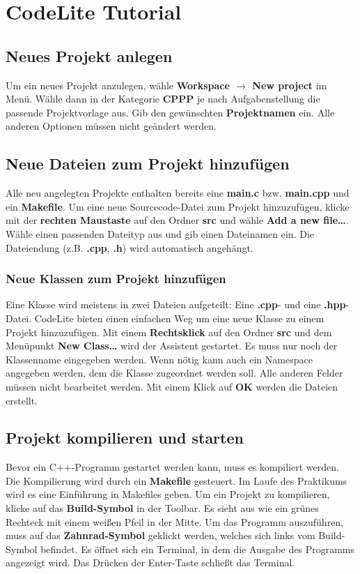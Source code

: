 \section{\ExercisePrefixAdditionalInformation CodeLite Tutorial}

\subsection{Neues Projekt anlegen}
Um ein neues Projekt anzulegen, wähle \textbf{Workspace $\rightarrow$ New project} im Menü. 
Wähle dann in der Kategorie \textbf{CPPP} je nach Aufgabenstellung die passende Projektvorlage aus.
Gib den gewünschten \textbf{Projektnamen} ein. 
Alle anderen Optionen müssen nicht geändert werden.

\subsection{Neue Dateien zum Projekt hinzufügen}
Alle neu angelegten Projekte enthalten bereits eine \textbf{main.c} bzw. \textbf{main.cpp} und ein \textbf{Makefile}.
Um eine neue Sourcecode-Datei zum Projekt hinzuzufügen, klicke mit der \textbf{rechten Maustaste} auf den Ordner \textbf{src} und wähle \textbf{Add a new file\dots}.
Wähle einen passenden Dateityp aus und gib einen Dateinamen ein.
Die Dateiendung (z.B. \textbf{.cpp}, \textbf{.h}) wird automatisch angehängt.

\subsubsection{Neue Klassen zum Projekt hinzufügen}
Eine Klasse wird meistens in zwei Dateien aufgeteilt: Eine \textbf{.cpp}- und eine \textbf{.hpp}-Datei. 
CodeLite bieten einen einfachen Weg um eine neue Klasse zu einem Projekt hinzuzufügen. 
Mit einem \textbf{Rechtsklick} auf den Ordner \textbf{src} und dem Menüpunkt \textbf{New Class\dots} wird der Assistent gestartet. 
Es muss nur noch der Klassenname eingegeben werden. 
Wenn nötig kann auch ein Namespace angegeben werden, dem die Klasse zugeordnet werden soll. 
Alle anderen Felder müssen nicht bearbeitet werden. 
Mit einem Klick auf \textbf{OK} werden die Dateien erstellt.


\subsection{Projekt kompilieren und starten}
Bevor ein C++-Programm gestartet werden kann, muss es kompiliert werden.
Die Kompilierung wird durch ein \textbf{Makefile} gesteuert. 
Im Laufe des Praktikums wird es eine Einführung in Makefiles geben.
Um ein Projekt zu kompilieren, klicke auf das \textbf{Build-Symbol} in der Toolbar. 
Es sieht aus wie ein grünes Rechteck mit einem weißen Pfeil in der Mitte.
Um das Programm auszuführen, muss auf das \textbf{Zahnrad-Symbol} geklickt werden, welches sich links vom Build-Symbol befindet. 
Es öffnet sich ein Terminal, in dem die Ausgabe des Programms angezeigt wird. 
Das Drücken der Enter-Taste schließt das Terminal.


